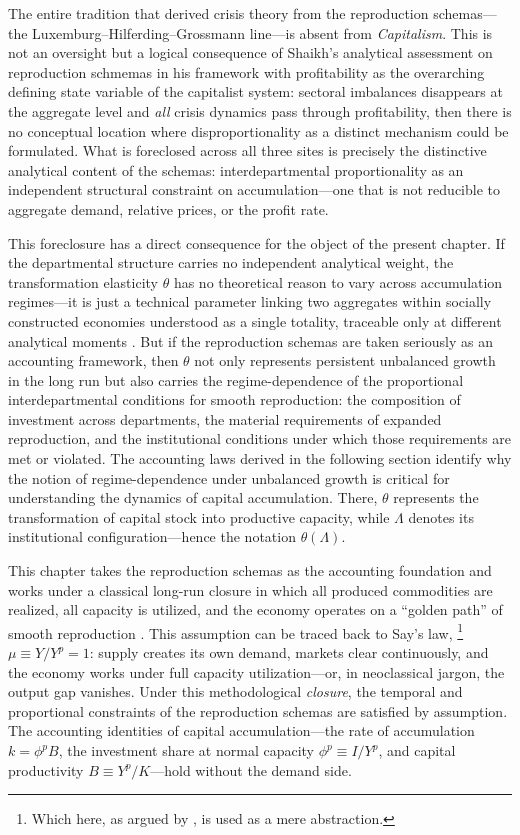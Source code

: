 The entire tradition that derived crisis theory from the reproduction schemas---the Luxemburg--Hilferding--Grossmann line---is absent from \emph{Capitalism}. This is not an oversight but a logical consequence of Shaikh's analytical assessment on reproduction schmemas in his framework with profitability as the overarching defining state variable of the capitalist system: sectoral imbalances disappears at the aggregate level and \emph{all} crisis dynamics pass through profitability, then there is no conceptual location where disproportionality as a distinct mechanism could be formulated. What is foreclosed across all three sites is precisely the distinctive analytical content of the schemas: interdepartmental proportionality as an independent structural constraint on accumulation---one that is not reducible to aggregate demand, relative prices, or the profit rate.

This foreclosure has a direct consequence for the object of the present chapter. If the departmental structure carries no independent analytical weight, the transformation elasticity $\theta$ has no theoretical reason to vary across accumulation regimes---it is just a technical parameter linking two aggregates within socially constructed economies understood as a single totality, traceable only at different analytical moments \citep{Vidal2012}. But if the reproduction schemas are taken seriously as an accounting framework, then $\theta$ not only represents persistent unbalanced growth in the long run but also carries the regime-dependence of the proportional interdepartmental conditions for smooth reproduction: the composition of investment across departments, the material requirements of expanded reproduction, and the institutional conditions under which those requirements are met or violated. The accounting laws derived in the following section identify why the notion of regime-dependence under unbalanced growth is critical for understanding the dynamics of capital accumulation. There, $\theta$ represents the transformation of capital stock into productive capacity, while $\Lambda$ denotes its institutional configuration---hence the notation $\theta(\Lambda)$.

This chapter takes the reproduction schemas as the accounting foundation and works under a classical long-run closure in which all produced commodities are realized, all capacity is utilized, and the economy operates on a ``golden path'' of smooth reproduction \citep{Basu2022}. This assumption can be traced back to Say's law,%
\footnote{Which here, as argued by \citet{Foley1985}, is used as a mere abstraction.}
$\mu \equiv Y/Y^p = 1$: supply creates its own demand, markets clear continuously, and the economy works under full capacity utilization---or, in neoclassical jargon, the output gap vanishes. Under this methodological \emph{closure}, the temporal and proportional constraints of the reproduction schemas are satisfied by assumption. The accounting identities of capital accumulation---the rate of accumulation $k = \phi^p B$, the investment share at normal capacity $\phi^p \equiv I/Y^p$, and capital productivity $B \equiv Y^p/K$---hold without the demand side.

